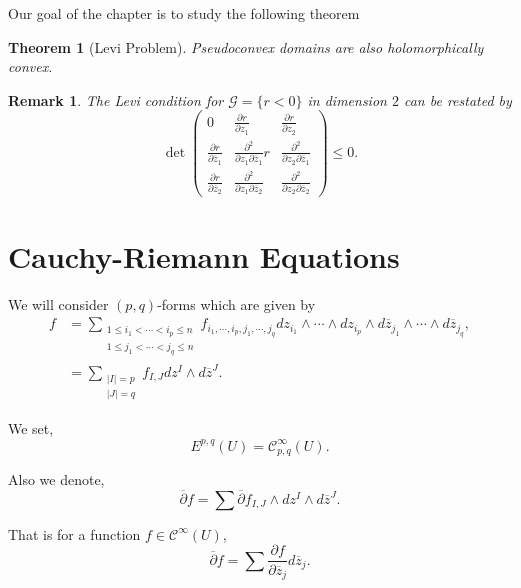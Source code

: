 \documentclass{article}
\newtheorem{theorem}{Theorem} [section]
\newtheorem{remark}{Remark}[section]
\newcommand{\G}[0]{\mathcal{G}}
\newcommand{\pd}[2]{{\frac {\partial#1} {\partial#2}}}
\newcommand{\secconjder}[2]{{\frac {\partial^2} {\partial z_{#1}\partial \overline{z}_{#2}}}}
\newcommand{\ck}[1]{\mathcal{C}^{#1}}
\newcommand{\cinf}[0]{\ck{\infty}}
\begin{document}
Our goal of the chapter is to study the following theorem

\begin{theorem}[Levi Problem]
  Pseudoconvex domains are also holomorphically convex.
\end{theorem}

\begin{remark}
  The Levi condition for $\G=\{r<0\}$ in dimension $2$ can be restated by 
  \begin{equation*}
    \det\begin{pmatrix}
      0 & \pd{r}{z_1} & \pd{r}{z_2}\\
      \pd{r}{\overline{z}_1} & \secconjder{1}{1}r& \secconjder{2}{1}\\
      \pd{r}{\overline{z}_2} & \secconjder{1}{2} & \secconjder{2}{2}
    \end{pmatrix}
    \leq 0.
  \end{equation*}
\end{remark}

\section{Cauchy-Riemann Equations}
We will consider $(p,q)$-forms which are given by 
\begin{align*}
  f & = \sum_{\substack{1\leq i_1<\cdots<i_p\leq n\\ 1\leq j_1<\cdots<j_q\leq n}} f_{i_1,\cdots,i_p,j_1,\cdots,j_q}dz_{i_1}\wedge\cdots\wedge dz_{i_p}\wedge d\overline{z}_{j_1}\wedge\cdots\wedge d\overline{z}_{j_q},\\
  & = \sum_{\substack{\vert I\vert = p\\ \vert J\vert = q}}f_{I,J}dz^I\wedge d\overline{z}^J.
\end{align*}

We set,
\begin{equation*}
  E^{p,q}(U) = \mathcal{C}_{p,q}^\infty (U).
\end{equation*}

Also we denote,
\begin{equation*}
  \overline{\partial}f = \sum\overline{\partial}f_{I,J}\wedge dz^I\wedge d\overline{z}^J.
\end{equation*}

That is for a function $f\in\cinf(U)$, 
\begin{equation*}
  \overline{\partial}f = \sum\pd{f}{\overline{z}_j}d\overline{z}_j.
\end{equation*}
\end{document}
